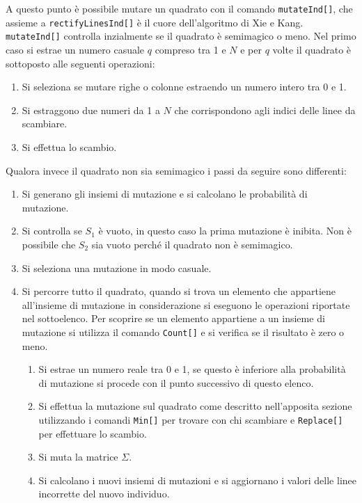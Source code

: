 \documentclass[italian,twoside,twocolumn]{article}
\begin{document}
A questo punto è possibile mutare un quadrato con il comando \texttt{mutateInd[]}, che assieme a \texttt{rectifyLinesInd[]} è il cuore dell'algoritmo di Xie e Kang. \texttt{mutateInd[]} controlla inzialmente se il quadrato è semimagico o meno. Nel primo caso si estrae un numero casuale $ q $ compreso tra 1 e $ N $ e per $ q $ volte il quadrato è sottoposto alle seguenti operazioni:
\begin{enumerate}
	\item Si seleziona se mutare righe o colonne estraendo un numero intero tra 0 e 1.
	\item Si estraggono due numeri da 1 a $ N $ che corrispondono agli indici delle linee da scambiare.
	\item Si effettua lo scambio.
\end{enumerate}
Qualora invece il quadrato non sia semimagico i passi da seguire sono differenti:
\begin{enumerate}
	\item Si generano gli insiemi di mutazione e si calcolano le probabilità di mutazione.
	\item Si controlla se $ S_1 $ è vuoto, in questo caso la prima mutazione è inibita. Non è possibile che $ S_2 $ sia vuoto perché il quadrato non è semimagico.
	\item Si seleziona una mutazione in modo casuale.
	\item Si percorre tutto il quadrato, quando si trova un elemento che appartiene all'insieme di mutazione in considerazione si eseguono le operazioni riportate nel sottoelenco. Per scoprire se un elemento appartiene a un insieme di mutazione si utilizza il comando \texttt{Count[]} e si verifica se il risultato è zero o meno.
	\begin{enumerate}
		\item Si estrae un numero reale tra 0 e 1, se questo è inferiore alla probabilità di mutazione si procede con il punto successivo di questo elenco.
		\item Si effettua la mutazione sul quadrato come descritto nell'apposita sezione utilizzando i comandi \texttt{Min[]} per trovare con chi scambiare e \texttt{Replace[]} per effettuare lo scambio.
		\item Si muta la matrice $ \Sigma $.
		\item Si calcolano i nuovi insiemi di mutazioni e si aggiornano i valori delle linee incorrette del nuovo individuo.
	\end{enumerate}
\end{enumerate}
\end{document}

